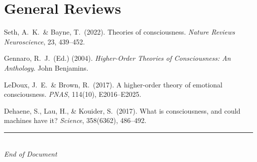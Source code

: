 \documentclass[11pt,a4paper]{report}
\begin{document}
\section*{General Reviews}
\begin{enumerate}[label={[\arabic*]}, leftmargin=2.5em, start=25]
  \item Seth, A.\ K.\ \& Bayne, T.\ (2022). Theories of consciousness. \textit{Nature Reviews Neuroscience}, 23, 439--452.
  \item Gennaro, R.\ J.\ (Ed.) (2004). \textit{Higher-Order Theories of Consciousness: An Anthology}. John Benjamins.
  \item LeDoux, J.\ E.\ \& Brown, R.\ (2017). A higher-order theory of emotional consciousness. \textit{PNAS}, 114(10), E2016--E2025.
  \item Dehaene, S., Lau, H., \& Kouider, S.\ (2017). What is consciousness, and could machines have it? \textit{Science}, 358(6362), 486--492.
\end{enumerate}

\vfill
\begin{center}
  {\color{gray}\rule{0.4\textwidth}{0.5pt}}\\[8pt]
  {\small\color{gray}\itshape End of Document}
\end{center}
\end{document}
